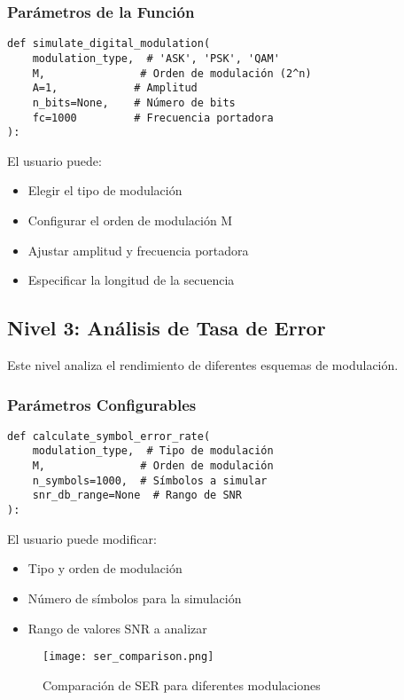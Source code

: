 \documentclass[12pt,a4paper]{article}
\begin{document}
\subsubsection{Parámetros de la Función}
\begin{lstlisting}[caption=Parámetros de simulate\_digital\_modulation]
def simulate_digital_modulation(
    modulation_type,  # 'ASK', 'PSK', 'QAM'
    M,               # Orden de modulación (2^n)
    A=1,            # Amplitud
    n_bits=None,    # Número de bits
    fc=1000         # Frecuencia portadora
):
\end{lstlisting}

El usuario puede:
\begin{itemize}
    \item Elegir el tipo de modulación
    \item Configurar el orden de modulación M
    \item Ajustar amplitud y frecuencia portadora
    \item Especificar la longitud de la secuencia
\end{itemize}

\subsection{Nivel 3: Análisis de Tasa de Error}
Este nivel analiza el rendimiento de diferentes esquemas de modulación.

\subsubsection{Parámetros Configurables}
\begin{lstlisting}[caption=Parámetros del análisis de error]
def calculate_symbol_error_rate(
    modulation_type,  # Tipo de modulación
    M,               # Orden de modulación
    n_symbols=1000,  # Símbolos a simular
    snr_db_range=None  # Rango de SNR
):
\end{lstlisting}

El usuario puede modificar:
\begin{itemize}
    \item Tipo y orden de modulación
    \item Número de símbolos para la simulación
    \item Rango de valores SNR a analizar
\end{itemize}

\begin{figure}[H]
    \centering
    \texttt{[image: ser\_comparison.png]}
    \caption{Comparación de SER para diferentes modulaciones}
\end{figure}
\end{document}
